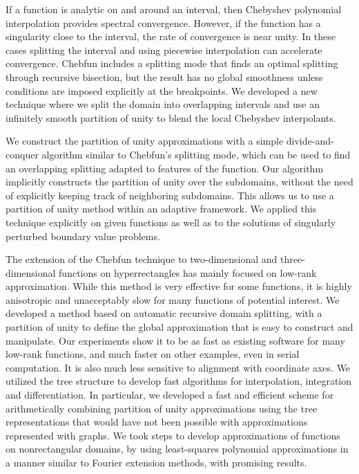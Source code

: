 
If a function is analytic on and around an interval, then Chebyshev polynomial
interpolation provides spectral convergence. However, if the function has a singularity close to the interval, the rate of convergence is near unity. In these cases splitting the interval and using piecewise interpolation can accelerate convergence. Chebfun includes a splitting mode that finds an optimal splitting through recursive bisection, but the result has no global smoothness unless conditions are imposed explicitly at the breakpoints. We developed a new technique where we split the domain into overlapping intervals
and use an infinitely smooth partition of unity to blend the local Chebyshev interpolants. 

We construct the partition of unity approximations with a simple divide-and-conquer algorithm similar to Chebfun’s splitting mode, which can be used to find an overlapping splitting adapted to features of the function. Our algorithm implicitly constructs the partition of unity over the subdomains, without the need of explicitly keeping track of neighboring subdomains. This allows us to use a partition of unity method within an adaptive framework. We applied this technique explicitly on given functions as well as to the solutions of singularly perturbed boundary value problems.

The extension of the Chebfun technique to two-dimensional and three-dimensional functions on hyperrectangles has mainly focused on low-rank approximation. While this method is very effective for some functions, it is highly anisotropic and unacceptably slow for many functions of potential interest. We developed a method based on automatic recursive domain splitting, with a partition of unity to define the global approximation that is easy to construct and manipulate. Our experiments show it to be as fast as existing software for many low-rank functions, and much faster on other examples, even in serial computation. It is also much less sensitive to alignment with coordinate axes. We utilized the tree structure to develop fast algorithms for interpolation, integration and differentiation. In particular, we developed a fast and efficient scheme for arithmetically combining partition of unity approximations using the tree representations that would have not been possible with approximations represented with graphs. We took steps to develop approximations of functions on nonrectangular domains, by using least-squares polynomial approximations in a manner similar to Fourier extension methods, with promising results. 

